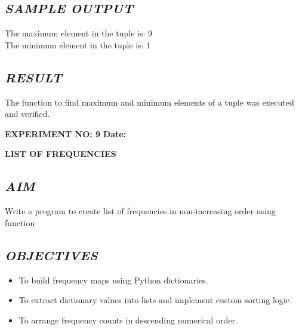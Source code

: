\documentclass[11pt,a4paper]{article}
\begin{document}
\subsection*{\textit{SAMPLE OUTPUT}}
\begin{tcolorbox}[colback=black!85,colframe=navyblue,title=\textbf{Terminal Output},coltitle=white,fonttitle=\bfseries\small]
\small\ttfamily\color{green!30!white}
The maximum element in the tuple is: 9\\
The minimum element in the tuple is: 1
\end{tcolorbox}

\subsection*{\textit{RESULT}}
The function to find maximum and minimum elements of a tuple was executed and verified.

\newpage

\noindent
\textbf{\large EXPERIMENT NO: 9} \hfill \textbf{\large Date: \underline{\hspace{3cm}}}

\vspace{0.2cm}
\begin{center}
{\Huge \textbf{\textcolor{navyblue}{LIST OF FREQUENCIES}}}
\end{center}
\vspace{0.3cm}

\subsection*{\textit{AIM}}
Write a program to create list of frequencies in non-increasing order using function

\subsection*{\textit{OBJECTIVES}}
\begin{itemize}
  \item To build frequency maps using Python dictionaries.
  \item To extract dictionary values into lists and implement custom sorting logic.
  \item To arrange frequency counts in descending numerical order.
\end{itemize}
\end{document}
